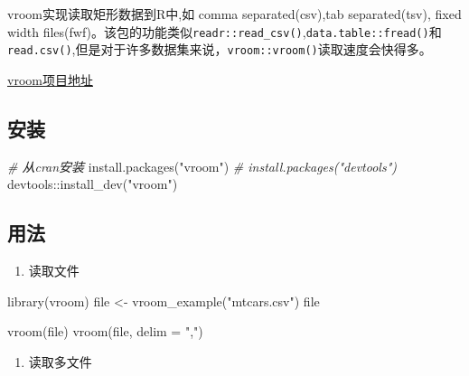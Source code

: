 \documentclass[
]{book}
\newenvironment{Shaded}{\begin{snugshade}}{\end{snugshade}}
\newcommand{\AttributeTok}[1]{\textcolor[rgb]{0.77,0.63,0.00}{#1}}
\newcommand{\CommentTok}[1]{\textcolor[rgb]{0.56,0.35,0.01}{\textit{#1}}}
\newcommand{\FunctionTok}[1]{\textcolor[rgb]{0.00,0.00,0.00}{#1}}
\newcommand{\NormalTok}[1]{#1}
\newcommand{\OtherTok}[1]{\textcolor[rgb]{0.56,0.35,0.01}{#1}}
\newcommand{\SpecialCharTok}[1]{\textcolor[rgb]{0.00,0.00,0.00}{#1}}
\newcommand{\StringTok}[1]{\textcolor[rgb]{0.31,0.60,0.02}{#1}}
\providecommand{\tightlist}{%
  \setlength{\itemsep}{0pt}\setlength{\parskip}{0pt}}
\begin{document}
vroom实现读取矩形数据到R中,如 comma separated(csv),tab separated(tsv), fixed width files(fwf)。该包的功能类似\texttt{readr::read\_csv()},\texttt{data.table::fread()}和\texttt{read.csv()},但是对于许多数据集来说，\texttt{vroom::vroom()}读取速度会快得多。

\href{https://vroom.r-lib.org/index.html}{vroom项目地址}

\hypertarget{ux5b89ux88c5-3}{%
\subsection{安装}\label{ux5b89ux88c5-3}}

\begin{Shaded}
\begin{Highlighting}[]
\CommentTok{\# 从cran安装}
\FunctionTok{install.packages}\NormalTok{(}\StringTok{"vroom"}\NormalTok{)}
\CommentTok{\# install.packages("devtools")}
\NormalTok{devtools}\SpecialCharTok{::}\FunctionTok{install\_dev}\NormalTok{(}\StringTok{"vroom"}\NormalTok{)}
\end{Highlighting}
\end{Shaded}

\hypertarget{ux7528ux6cd5-3}{%
\subsection{用法}\label{ux7528ux6cd5-3}}

\begin{enumerate}
\def\labelenumi{\arabic{enumi}.}
\tightlist
\item
  读取文件
\end{enumerate}

\begin{Shaded}
\begin{Highlighting}[]
\FunctionTok{library}\NormalTok{(vroom)}
\NormalTok{file }\OtherTok{\textless{}{-}} \FunctionTok{vroom\_example}\NormalTok{(}\StringTok{"mtcars.csv"}\NormalTok{)}
\NormalTok{file}

\FunctionTok{vroom}\NormalTok{(file)}
\FunctionTok{vroom}\NormalTok{(file, }\AttributeTok{delim =} \StringTok{","}\NormalTok{)}
\end{Highlighting}
\end{Shaded}

\begin{enumerate}
\def\labelenumi{\arabic{enumi}.}
\setcounter{enumi}{1}
\tightlist
\item
  读取多文件
\end{enumerate}
\end{document}
